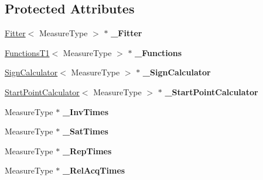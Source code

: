 \subsection*{Protected Attributes}
\begin{DoxyCompactItemize}
\item 
\mbox{\label{class_ox_1_1_calculator_t1_a4863afe5f79555d5c6c31f6726d18578}} 
\mbox{\hyperlink{class_ox_1_1_fitter}{Fitter}}$<$ Measure\+Type $>$ $\ast$ {\bfseries \+\_\+\+Fitter}
\item 
\mbox{\label{class_ox_1_1_calculator_t1_a84ed6f4b762088d71e9796002253a39d}} 
\mbox{\hyperlink{class_ox_1_1_functions_t1}{Functions\+T1}}$<$ Measure\+Type $>$ $\ast$ {\bfseries \+\_\+\+Functions}
\item 
\mbox{\label{class_ox_1_1_calculator_t1_a6408fb35f4aeb4793bef57b491f8fa89}} 
\mbox{\hyperlink{class_ox_1_1_sign_calculator}{Sign\+Calculator}}$<$ Measure\+Type $>$ $\ast$ {\bfseries \+\_\+\+Sign\+Calculator}
\item 
\mbox{\label{class_ox_1_1_calculator_t1_a6487bcc203c83566702a12a382ebe97f}} 
\mbox{\hyperlink{class_ox_1_1_start_point_calculator}{Start\+Point\+Calculator}}$<$ Measure\+Type $>$ $\ast$ {\bfseries \+\_\+\+Start\+Point\+Calculator}
\item 
\mbox{\label{class_ox_1_1_calculator_t1_a74859ae00eada8ba29c9073407e5b4b5}} 
Measure\+Type $\ast$ {\bfseries \+\_\+\+Inv\+Times}
\item 
\mbox{\label{class_ox_1_1_calculator_t1_af6d8cb61507e8ae7b71afb2170a51094}} 
Measure\+Type $\ast$ {\bfseries \+\_\+\+Sat\+Times}
\item 
\mbox{\label{class_ox_1_1_calculator_t1_a5f437458d529fb560b81c15d58ec1bf6}} 
Measure\+Type $\ast$ {\bfseries \+\_\+\+Rep\+Times}
\item 
\mbox{\label{class_ox_1_1_calculator_t1_a25eac91c68d5c10100596951153990b4}} 
Measure\+Type $\ast$ {\bfseries \+\_\+\+Rel\+Acq\+Times}
\item 

\end{DoxyCompactItemize}
